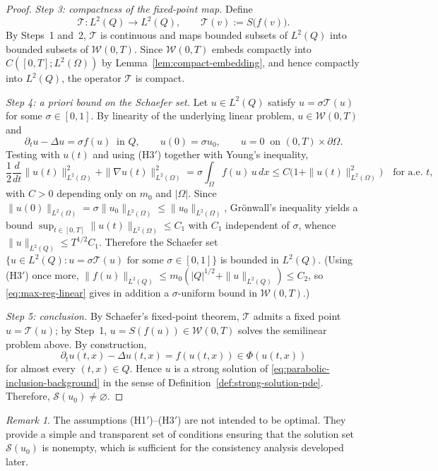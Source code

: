 \documentclass[11pt]{elsarticle}
\theoremstyle{definition}
\theoremstyle{remark}
\newtheorem{remark}[theorem]{Remark}
\numberwithin{equation}{section}
\begin{document}
\begin{proof}
	\emph{Step 3: compactness of the fixed-point map.}
	Define
	\[
	\mathcal{T}:L^2(Q)\longrightarrow L^2(Q),
	\qquad
	\mathcal{T}(v):=S\bigl(f(v)\bigr).
	\]
	By Steps~1 and~2, $\mathcal{T}$ is continuous and maps bounded subsets
	of $L^2(Q)$ into bounded subsets of $\mathcal{W}(0,T)$. Since
	$\mathcal{W}(0,T)$ embeds compactly into $C([0,T];L^2(\Omega))$ by
	Lemma~\ref{lem:compact-embedding}, and hence compactly into $L^2(Q)$,
	the operator $\mathcal{T}$ is compact.
	
	\emph{Step 4: a priori bound on the Schaefer set.}
	Let $u\in L^2(Q)$ satisfy $u=\sigma\mathcal{T}(u)$ for some
	$\sigma\in[0,1]$. By linearity of the underlying linear problem,
	$u\in\mathcal{W}(0,T)$ and
	\[
	\partial_t u-\Delta u=\sigma f(u) \ \text{ in }Q,
	\qquad u(0)=\sigma u_0,
	\qquad u=0 \ \text{ on }(0,T)\times\partial\Omega.
	\]
	Testing with $u(t)$ and using \textup{(H3$'$)} together with Young's
	inequality,
	\[
	\frac12\frac{d}{dt}\|u(t)\|_{L^2(\Omega)}^2
	+\|\nabla u(t)\|_{L^2(\Omega)}^2
	=\sigma\int_\Omega f(u)\,u\,dx
	\le C\bigl(1+\|u(t)\|_{L^2(\Omega)}^2\bigr)
	\quad\text{for a.e. } t,
	\]
	with $C>0$ depending only on $m_0$ and $|\Omega|$. Since
	$\|u(0)\|_{L^2(\Omega)}=\sigma\|u_0\|_{L^2(\Omega)}
	\le\|u_0\|_{L^2(\Omega)}$, Gr\"onwall's inequality yields a bound
	$\sup_{t\in[0,T]}\|u(t)\|_{L^2(\Omega)}\le C_1$ with $C_1$ independent
	of $\sigma$, whence $\|u\|_{L^2(Q)}\le T^{1/2}C_1$. Therefore the
	Schaefer set
	$\bigl\{u\in L^2(Q):u=\sigma\mathcal{T}(u)
	\text{ for some }\sigma\in[0,1]\bigr\}$
	is bounded in $L^2(Q)$. (Using \textup{(H3$'$)} once more,
	$\|f(u)\|_{L^2(Q)}\le m_0(|Q|^{1/2}+\|u\|_{L^2(Q)})\le C_2$, so
	\eqref{eq:max-reg-linear} gives in addition a $\sigma$-uniform bound
	in $\mathcal{W}(0,T)$.)
	
	\emph{Step 5: conclusion.}
	By Schaefer's fixed-point theorem, $\mathcal{T}$ admits a fixed point
	$u=\mathcal{T}(u)$; by Step~1, $u=S(f(u))\in\mathcal{W}(0,T)$ solves
	the semilinear problem above. By construction,
	\[
	\partial_t u(t,x)-\Delta u(t,x)
	=
	f(u(t,x))
	\in
	\Phi(u(t,x))
	\]
	for almost every $(t,x)\in Q$.
	Hence $u$ is a strong solution of
	\eqref{eq:parabolic-inclusion-background}
	in the sense of Definition~\ref{def:strong-solution-pde}.
	Therefore,
	$\mathcal{S}(u_0)\neq\varnothing$.
\end{proof}

\begin{remark}
	The assumptions \textup{(H1$'$)--(H3$'$)} are not intended to be optimal.
	They provide a simple and transparent set of conditions ensuring that the
	solution set $\mathcal{S}(u_0)$ is nonempty, which is sufficient for the
	consistency analysis developed later.
\end{remark}
\end{document}
